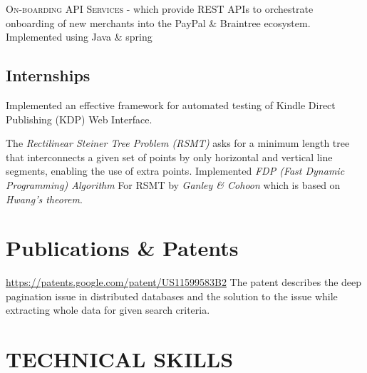 \documentclass[11pt, a4paper, sans]{moderncv}
\begin{document}
{\textsc{On-boarding API Services} - which provide REST APIs to orchestrate onboarding of new merchants into the PayPal \& Braintree ecosystem. Implemented using Java \& spring \newline} 

\subsection{Internships}
{Implemented an effective framework for automated testing of Kindle Direct Publishing (KDP) Web Interface.}

{The \textit{Rectilinear Steiner Tree Problem (RSMT)} asks for a minimum length tree that interconnects a given set of points by only horizontal and vertical line segments, enabling the use of extra points. Implemented \textit{ FDP (Fast Dynamic Programming) Algorithm } For RSMT by \textit{ Ganley \& Cohoon } which is based on \textit{ Hwang’s theorem}}.

\section{Publications \& Patents}
{\url{https://patents.google.com/patent/US11599583B2} \newline The patent describes the deep pagination issue in distributed databases and the solution to the issue while extracting whole data for given search criteria.}

\section{TECHNICAL SKILLS}
\end{document}
